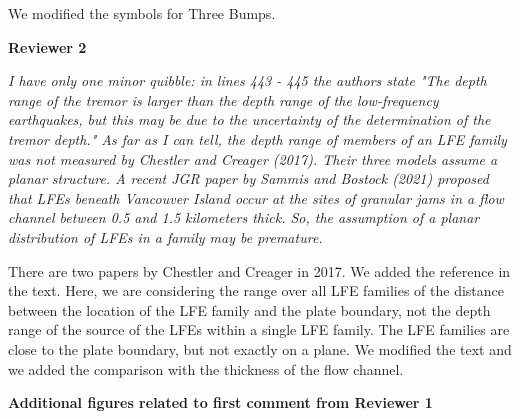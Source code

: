 \documentclass[letterpaper, 12pt]{article}
\begin{document}
\bigskip

We modified the symbols for Three Bumps.

\bigskip

\textbf{Reviewer 2}

\bigskip

\textit{I have only one minor quibble: in lines 443 - 445 the authors state "The depth range of the tremor is larger than the depth range of the low-frequency earthquakes, but this may be due to the uncertainty of the determination of the tremor depth." As far as I can tell, the depth range of members of an LFE family was not measured by Chestler and Creager (2017). Their three models assume a planar structure. A recent JGR paper by Sammis and Bostock (2021) proposed that LFEs beneath Vancouver Island occur at the sites of granular jams in a flow channel between 0.5 and 1.5 kilometers thick. So, the assumption of a planar distribution of LFEs in a family may be premature.}

\bigskip

There are two papers by Chestler and Creager in 2017. We added the reference in the text. Here, we are considering the range over all LFE families of the distance between the location of the LFE family and the plate boundary, not the depth range of the source of the LFEs within a single LFE family. The LFE families are close to the plate boundary, but not exactly on a plane. We modified the text and we added the comparison with the thickness of the flow channel.

\bigskip

\textbf{Additional figures related to first comment from Reviewer 1}

\bigskip
\end{document}
